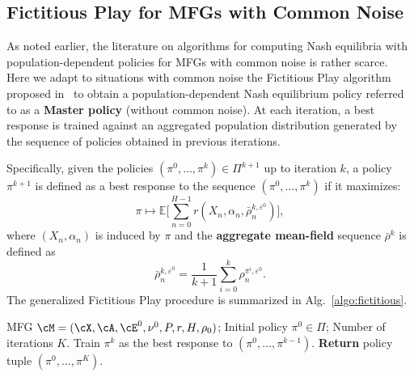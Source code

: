 \documentclass{article}
\newcommand{\defi}[1]{{\bf #1}}
\theoremstyle{plain}
\begin{document}
\subsection{Fictitious Play for MFGs with Common Noise}
\label{subsection:nash_equilibrium_cn}

As noted earlier, the literature on algorithms for computing Nash equilibria with population-dependent policies for MFGs with common noise is rather scarce. Here we adapt to situations with common noise the Fictitious Play algorithm proposed in~\cite{perrin_master_2022} to obtain a population-dependent Nash equilibrium policy referred to as a \defi{Master policy} (without common noise). 
% 
At each iteration, a best response is trained against an aggregated population distribution generated by the sequence of policies obtained in previous iterations. 

Specifically, given the policies $(\pi^0, \dots, \pi^k) \in \Pi^{k+1}$ up to iteration $k$, 
a policy $\pi^{k+1}$ is defined as a best response to the sequence $(\pi^0, \dots, \pi^k)$ if it maximizes:
$$
    \pi \mapsto \mathbb{E} \Big[ \sum_{n=0}^{H-1} r(X_n, \alpha_n, \bar{\rho}^{k, \varepsilon^0}_n) \Big],
$$
where $(X_n, \alpha_n)$ is induced by $\pi$ and the \defi{aggregate mean-field} sequence $\bar{\rho}^k$ is defined as
\begin{equation}
    \label{eq:aggregate-mf}
    \bar{\rho}^{k, \varepsilon^0}_{n} = \frac{1}{k+1}\sum_{i=0}^k \rho^{\pi^i, \varepsilon^0}_n.
\end{equation}
The generalized Fictitious Play procedure is summarized in Alg.~\ref{algo:fictitious}.
\begin{algorithm}[t]
\caption{Fictitious Play for MFG with Common Noise}
\begin{algorithmic}[1]
\label{algo:fictitious}
\REQUIRE MFG $\cM = (\cX, \cA, \cE^0, \nu^0, P, r, H, \rho_0)$; Initial policy $\pi^0 \in \Pi$; Number of iterations $K$.
    \STATE Train $\pi^k$ as the best response to $(\pi^0, \dots, \pi^{k-1})$.
\ENDFOR
\STATE \textbf{Return} policy tuple $(\pi^0, \dots, \pi^K)$.
\end{algorithmic}
\end{algorithm}
\end{document}

